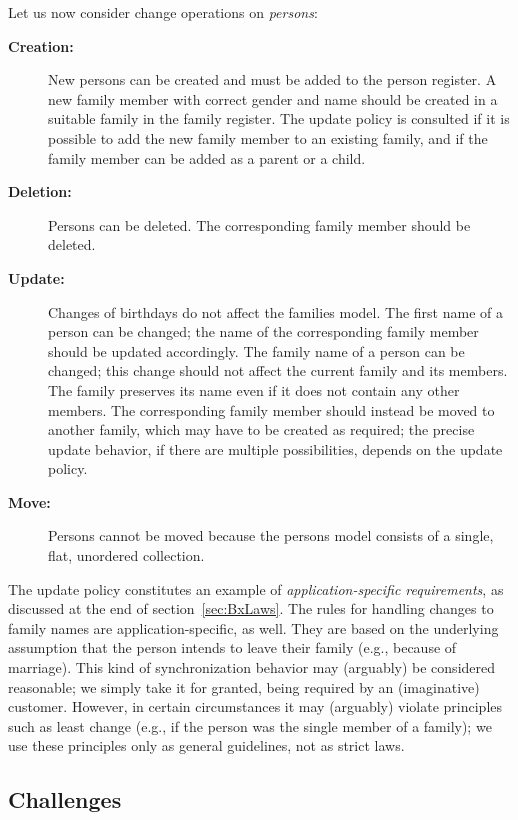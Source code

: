 \noindent Let us now consider change operations on \emph{persons}:
%
\begin{description}
    \item[\textbf{Creation:}]
    New persons can be created and must be added to the person register.
    A new family member with correct gender and name should be created in a suitable family in the family register.
    The update policy is consulted if it is possible to add the new family member to an existing family, and if the family member can be added as a parent or a child.
    
    \item[\textbf{Deletion:}]
    Persons can be deleted.
    The corresponding family member should be deleted. 

    \item[\textbf{Update:}]
    Changes of birthdays do not affect the families model. 
%
    The first name of a person can be changed; 
    the name of the corresponding family member should be updated accordingly. 
%
    The family name of a person can be changed; 
    this change should not affect the current family and its members.
    The family preserves its name even if it does not contain any other members.
    The corresponding family member should instead be moved to another family, which may have to be created as required; the precise update behavior, if there are multiple possibilities, depends on the update policy.
    
    \item[\textbf{Move:}]
    Persons cannot be moved because the persons model consists of a single, flat, unordered collection. 
\end{description}

The update policy constitutes an example of \emph{ap\-pli\-ca\-tion-specific requirements}, as discussed at the end of section~\ref{sec:BxLaws}. The rules for handling changes to family names are application-specific, as well. They are based on the underlying assumption that the person intends to leave their family (e.g., because of marriage).
This kind of synchronization behavior may (arguably) be considered reasonable; we simply take it for granted, being required by an (imaginative) customer.
However, in certain circumstances it may (arguably) violate principles such as least change (e.g., if the person was the single member of a family); we use these principles only as general guidelines, not as strict laws. 


\subsection{Challenges}
\label{sec:Challenges}

